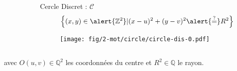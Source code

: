 \begin{frame}
{\begin{columns}[t]
\begin{column}{0.5\linewidth}
    \end{column}
    \begin{column}{0.5\linewidth}
      \begin{block}{Cercle Discret : $\mathcal{C}$}
        $$\left\{ (x,y) \in \alert{\mathbb{Z}^{2}} | (x - u)^2 + (y - v)^2 \alert{\stackrel{?}{=}} R^2 \right\}$$
        \vspace{-0.24cm}
        \begin{figure}[h!]
          \centering
          \texttt{[image: fig/2-mot/circle/circle-dis-0.pdf]}
        \end{figure}
      \end{block}  
    \end{column}
  \end{columns} 
}

\begin{exampleblock}{}
  avec $O(u,v) \in \mathbb{Q}^{2}$ les coordonnées du centre et $R^2 \in \mathbb{Q}$ le rayon.\\
\end{exampleblock}
\end{frame}


